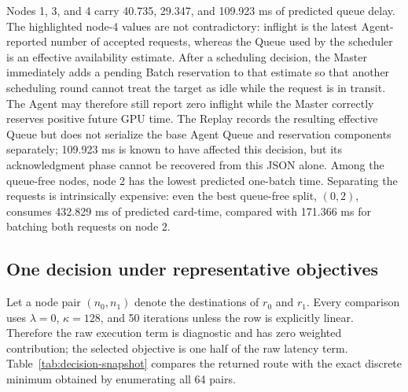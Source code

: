\documentclass[10pt]{article}
\begin{document}
Nodes 1, 3, and 4 carry 40.735, 29.347, and 109.923 ms of predicted queue
delay. The highlighted node-4 values are not contradictory: inflight is the
latest Agent-reported number of accepted requests, whereas the Queue used by
the scheduler is an effective availability estimate. After a scheduling
decision, the Master immediately adds a pending Batch reservation to that
estimate so that another scheduling round cannot treat the target as idle
while the request is in transit. The Agent may therefore still report zero
inflight while the Master correctly reserves positive future GPU time. The
Replay records the resulting effective Queue but does not serialize the base
Agent Queue and reservation components separately; 109.923 ms is known to
have affected this decision, but its acknowledgment phase cannot be recovered
from this JSON alone. Among the queue-free nodes, node 2 has the lowest
predicted one-batch time. Separating the requests is intrinsically expensive:
even the best queue-free split, $(0,2)$, consumes 432.829 ms of predicted
card-time, compared with 171.366 ms for batching both requests on node 2.

\subsection{One decision under representative objectives}

Let a node pair $(n_0,n_1)$ denote the destinations of $r_0$ and $r_1$.
Every comparison uses $\lambda=0$, $\kappa=128$, and 50 iterations unless the
row is explicitly linear. Therefore the raw execution term is diagnostic and
has zero weighted contribution; the selected objective is one half of the raw
latency term. Table~\ref{tab:decision-snapshot} compares the returned route
with the exact discrete minimum obtained by enumerating all 64 pairs.
\end{document}
